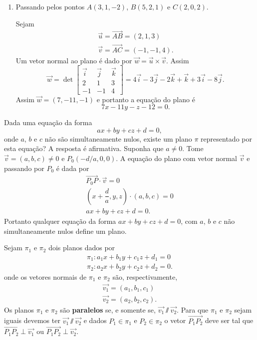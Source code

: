 \begin{exemplos}
\begin{enumerate}
        \item Passando pelos pontos $A(3,1,-2)$, $B(5,2,1)$ e $C(2,0,2)$.
        \begin{solucao}
            Sejam
            \begin{align*}
                \vec{u} = \vec{AB} = (2,1,3)\\
                \vec{v} = \vec{AC} = (-1,-1,4).
            \end{align*}
            Um vetor normal ao plano \'e dado por $\vec{w} = \vec{u}\times\vec{v}$. Assim
            \[
                \vec{w} = \det \begin{bmatrix}
                    \vec{i} & \vec{j} & \vec{k}\\
                    2 & 1 & 3\\
                    -1 & -1 & 4
                \end{bmatrix} = 4\vec{i} - 3\vec{j} - 2\vec{k} + \vec{k} + 3\vec{i} - 8\vec{j}.
            \]
            Assim $\vec{w} = (7,-11,-1)$ e portanto a equa\c{c}\~ao do plano \'e
            \[
                7x - 11y - z - 12 = 0.
            \]
        \end{solucao}
    \end{enumerate}
\end{exemplos}

Dada uma equa\c{c}\~ao da forma
    \[
        ax + by + cz + d = 0,
    \]
onde $a$, $b$ e $c$ n\~ao s\~ao simultaneamente nulos, existe um plano $\pi$ representado por esta equa\c{c}\~ao? A resposta \'e afirmativa. Suponha que $a \ne 0$. Tome $\vec{v} = (a,b,c) \ne 0$ e $P_0(-d/a,0,0)$. A equa\c{c}\~ao do plano com vetor normal $\vec{v}$ e passando por $P_0$ \'e dada por
    \begin{align*}
        \vec{P_0P}\cdot\vec{v} = 0\\
        \left(x + \dfrac{d}{a},y,z\right)\cdot(a,b,c) = 0\\
        ax + by + cz + d = 0.
    \end{align*}
Portanto qualquer equa\c{c}\~ao da forma $ax + by + cz + d = 0$, com $a$, $b$ e $c$ n\~ao simultaneamente nulos define um plano.

Sejam $\pi_1$ e $\pi_2$ dois planos dados por
    \begin{align*}
        \pi_1 : a_1x + b_1y + c_1z + d_1 = 0\\
        \pi_2 : a_2x + b_2y + c_2z + d_2 = 0.
    \end{align*}
onde os vetores normais de $\pi_1$ e $\pi_2$ s\~ao, respectivamente,
    \begin{align*}
        \vec{v_1} = (a_1, b_1, c_1)\\
        \vec{v_2} = (a_2, b_2, c_2).
    \end{align*}
Os planos $\pi_1$ e $\pi_2$ s\~ao \textbf{paralelos} se, e somente se, $\vec{v_1} \varparallel\vec{v_2}$. Para que $\pi_1$ e $\pi_2$ sejam iguais devemos ter $\vec{v_1}\varparallel\vec{v_2}$  e dados $P_1\in\pi_1$ e $P_2\in\pi_2$ o vetor $\vec{P_1P_2}$ deve ser tal que $\vec{P_1P_2}\perp\vec{v_1}$ ou $\vec{P_1P_2}\perp\vec{v_2}$.

